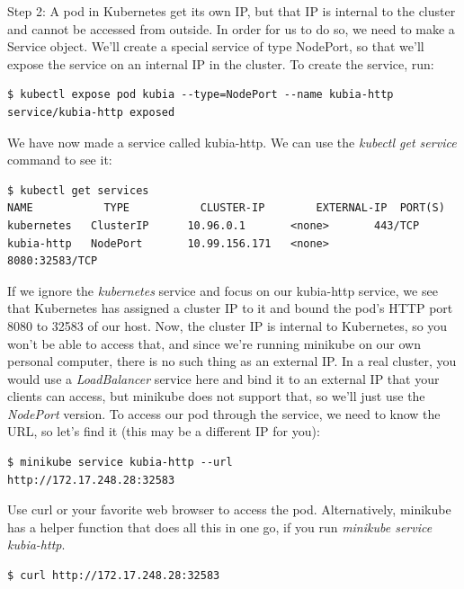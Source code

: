\documentclass[a4paper,10pt]{article}
\begin{document}
Step 2: A pod in Kubernetes get its own IP, but that IP is internal to the cluster and cannot be accessed from outside. In order for us to do so, we need to make a Service object. We'll create a special service of type NodePort, so that we'll expose the service on an internal IP in the cluster. To create the service, run:

\begin{lstlisting}[numbers=none, basicstyle=\mdseries]
$ kubectl expose pod kubia --type=NodePort --name kubia-http
service/kubia-http exposed
\end{lstlisting}

We have now made a service called kubia-http. We can use the \textit{kubectl get service} command to see it:

\begin{lstlisting}[numbers=none, basicstyle=\mdseries]
$ kubectl get services
NAME	       TYPE	          CLUSTER-IP	    EXTERNAL-IP	 PORT(S)
kubernetes   ClusterIP      10.96.0.1       <none>       443/TCP
kubia-http   NodePort       10.99.156.171   <none>       8080:32583/TCP
\end{lstlisting}

If we ignore the \textit{kubernetes} service and focus on our kubia-http service, we see that Kubernetes has assigned a cluster IP to it and bound the pod's HTTP port 8080 to 32583 of our host. Now, the cluster IP is internal to Kubernetes, so you won't be able to access that, and since we're running minikube on our own personal computer, there is no such thing as an external IP. In a real cluster, you would use a \textit{LoadBalancer} service here and bind it to an external IP that your clients can access, but minikube does not support that, so we'll just use the \textit{NodePort} version. To access our pod through the service, we need to know the URL, so let's find it (this may be a different IP for you):

\begin{lstlisting}[numbers=none, basicstyle=\mdseries]
$ minikube service kubia-http --url
http://172.17.248.28:32583
\end{lstlisting}

Use curl or your favorite web browser to access the pod. Alternatively, minikube has a helper function that does all this in one go, if you run \textit{minikube service kubia-http}.

\begin{lstlisting}[numbers=none, basicstyle=\mdseries]
$ curl http://172.17.248.28:32583
\end{lstlisting}
\end{document}
